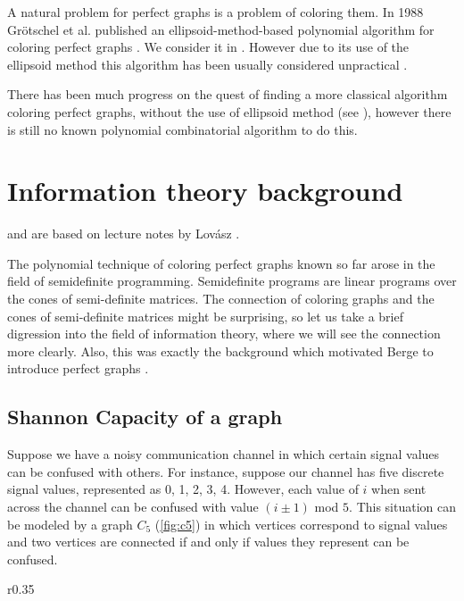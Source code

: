 A natural problem for perfect graphs is a problem of coloring them. In 1988 Gr\"otschel et al. published an ellipsoid-method-based polynomial algorithm for coloring perfect graphs \cite{Grtschel1993}. We consider it in . However due to its use of the ellipsoid method this algorithm has been usually considered unpractical \cite{coloringSquareFree,Chudnovsky2003, coloringArtemis}.

There has been much progress on the quest of finding a more classical algorithm coloring perfect graphs, without the use of ellipsoid method (see ), however there is still no known polynomial combinatorial algorithm to do this. 

\section{Information theory background}
\label{sec:InformationTheory}

 and  are based on lecture notes by Lovász \cite{Lovasz95}.

The polynomial technique of coloring perfect graphs known so far arose in the field of semidefinite programming. Semidefinite programs are linear programs over the cones of semi-definite matrices. The connection of coloring graphs and the cones of semi-definite matrices might be surprising, so let us take a brief digression into the field of information theory, where we will see the connection more clearly. Also, this was exactly the background which motivated Berge to introduce perfect graphs \cite{Chudnovsky2003}.

\subsection{Shannon Capacity of a graph}
\label{sec:ShannonCapacity}

Suppose we have a noisy communication channel in which certain signal values can be confused with others. For instance, suppose our channel has five discrete signal values, represented as 0, 1, 2, 3, 4. However, each value of $i$ when sent across the channel can be confused with value $(i \pm 1)$ mod $5$. This situation can be modeled by a graph $C_5$ (\cref{fig:c5}) in which vertices correspond to signal values and two vertices are connected if and only if values they represent can be confused.

\begin{wrapfigure}{r}{0.35\textwidth}
  
  \caption{An example of a noisy channel}%
  \label{fig:c5}
\end{wrapfigure}

